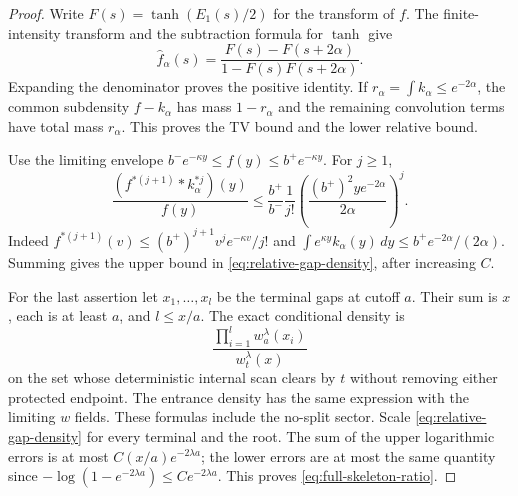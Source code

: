 \documentclass[11pt,letterpaper]{article}
\begin{document}
\begin{proof}
Write $F(s)=\tanh(E_1(s)/2)$ for the transform of $f$.
The finite-intensity transform and the subtraction formula for
$\tanh$ give
\[
 \widehat f_\alpha(s)
   =\frac{F(s)-F(s+2\alpha)}{1-F(s)F(s+2\alpha)}.
\]
Expanding the denominator proves the positive identity. If
$r_\alpha=\int k_\alpha\le e^{-2\alpha}$, the common subdensity
$f-k_\alpha$ has mass $1-r_\alpha$ and the remaining convolution
terms have total mass $r_\alpha$. This proves the TV bound and
the lower relative bound.

Use the limiting envelope
$b^-e^{-\kappa y}\le f(y)\le b^+e^{-\kappa y}$.
For $j\ge1$,
\[
 \frac{(f^{*(j+1)}*k_\alpha^{*j})(y)}{f(y)}
 \le\frac{b^+}{b^-}\frac1{j!}
       \left(\frac{(b^+)^2y e^{-2\alpha}}{2\alpha}\right)^j.
\]
Indeed $f^{*(j+1)}(v)\le(b^+)^{j+1}v^je^{-\kappa v}/j!$
and $\int e^{\kappa y}k_\alpha(y)\,dy
\le b^+e^{-2\alpha}/(2\alpha)$. Summing gives the upper bound
in \eqref{eq:relative-gap-density}, after increasing $C$.

For the last assertion let $x_1,\ldots,x_l$ be the terminal
gaps at cutoff $a$. Their sum is $x$, each is at least $a$,
and $l\le x/a$. The exact conditional density is
\[
 \frac{\prod_{i=1}^l w_a^\lambda(x_i)}{w_t^\lambda(x)}
\]
on the set whose deterministic internal scan clears by $t$
without removing either protected endpoint. The entrance density
has the same expression with the limiting $w$ fields. These
formulas include the no-split sector. Scale
\eqref{eq:relative-gap-density} for every terminal and the root.
The sum of the upper logarithmic errors is at most
$C(x/a)e^{-2\lambda a}$; the lower errors are at most the same
quantity since $-\log(1-e^{-2\lambda a})\le Ce^{-2\lambda a}$.
This proves \eqref{eq:full-skeleton-ratio}.
\end{proof}
\end{document}
